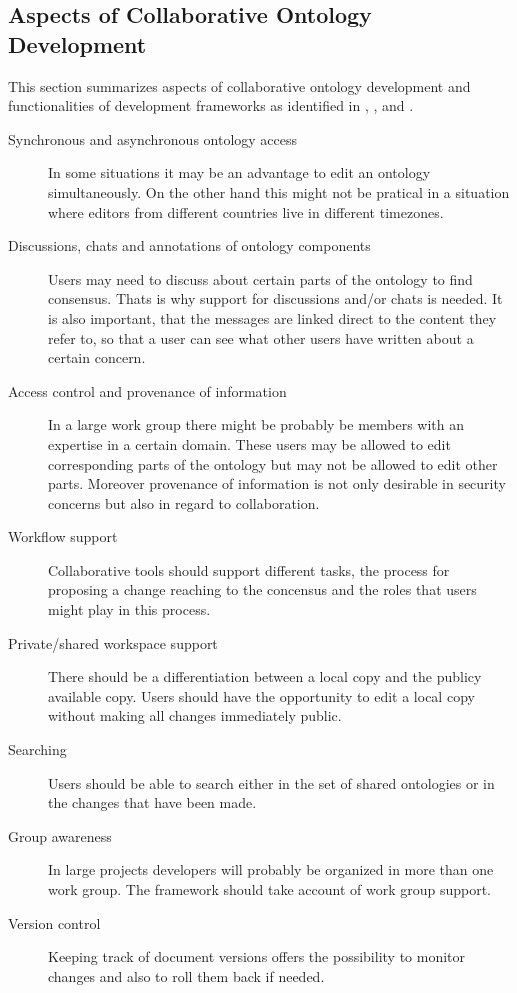 \subsection{Aspects of Collaborative Ontology Development}
This section summarizes aspects of collaborative ontology development and
functionalities of development frameworks as identified in
\cite{Tudorache2007}, \cite{tudorache2010CollabProtege},
and \cite{malzan2007CollabOntoDev}.
\begin{description}
        \item[Synchronous and asynchronous ontology access]
                In some situations it may be an advantage to edit an ontology
                simultaneously. On the other hand this might not be pratical in
                a situation where editors from different countries live in different
                timezones.
        \item[Discussions, chats and annotations of ontology components]
                Users may need to discuss about certain parts of the ontology to
                find consensus. Thats is why support for discussions and/or chats
                is needed. It is also important, that the messages are
                linked direct to the content they refer to, so that a user can see what
                other users have written about a certain concern.
        \item[Access control and provenance of information]
                In a large work group there might be probably be members with an expertise
                in a certain domain. These users may be allowed to edit corresponding
                parts of the ontology but may not be allowed to edit other parts.
                Moreover provenance of information is not only desirable in security
                concerns but also in regard to collaboration.
        \item[Workflow support]
                Collaborative tools should support different tasks, the process
                for proposing a change reaching to the concensus and the roles
                that users might play in this process.
        \item[Private/shared workspace support]
                There should be a differentiation between a local copy and the
                publicy available copy. Users should have the opportunity to edit
                a local copy without making all changes immediately public.
        \item[Searching]
                Users should be able to search either in the set of shared ontologies
                or in the changes that have been made.
        \item[Group awareness]
                In large projects developers will probably be organized in more than one
                work group. The framework should take account of work group support.  
        \item[Version control]
                Keeping track of document versions offers the possibility to monitor changes
                and also to roll them back if needed.
\end{description}



